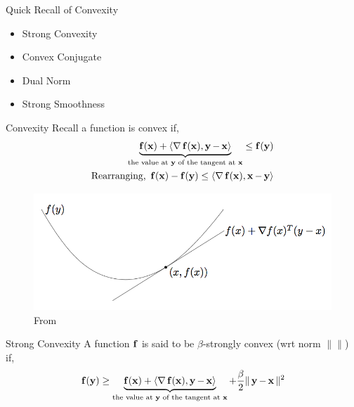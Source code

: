 

\begin{frame}{Quick Recall of Convexity}
  \begin{itemize}
  \item Strong Convexity
  \item Convex Conjugate
  \item Dual Norm
  \item Strong Smoothness
  \end{itemize}
\end{frame}

\begin{frame}{Convexity}
  Recall a function is convex if,
  \begin{align*} 
    \underbrace{\f(\x) + \dotprod{\grad \f(\x)}{\y-\x}}_{\text{the value at $\y$ of the tangent at $\x$}} \le \f(\y) \\
    \text{Rearranging, } \f(\x)-\f(\y) \le \dotprod{\grad \f(\x)} {\x-\y} \\
  \end{align*}
  \begin{figure}
    \includegraphics[scale=0.27]{images/convexity.png}
    \caption{From \cite{BV2004}}
  \end{figure}
\end{frame}

\begin{frame}{Strong Convexity}
  A function $\f$ is said to be $\beta$-strongly convex (wrt norm $\|\|$) if,
  \begin{align*}
   & \f(\y) \ge \underbrace{\f(\x) + \dotprod{\grad \f(\x)}{\y-\x}}_{\text{the value at $\y$ of the tangent at $\x$}} + \frac{\beta}{2} \|\y-\x\|^2\\
  \end{align*}
\end{frame}

